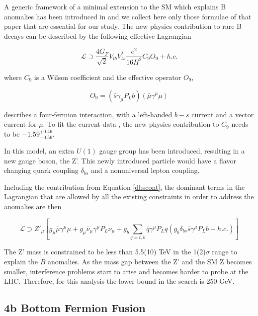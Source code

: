 A generic framework of a minimal extension to the SM which explains B anomalies has been introduced in \cite{Dalchenko:2017shg} and we collect here only those formulae of that paper that are essential for our study. The new physics contribution to rare B decays can be described by the following effective Lagrangian 

\begin{equation}
\label{dbscont}
\mathcal{L} \supset \frac{4G_{F}}{\sqrt{2}}V_{tb}V_{ts}^{*}\frac{e^{2}}{16\Pi^{2}}C_{9}O_{9} + h.c.
\end{equation}

where $C_{9}$ is a Wilson coefficient and the effective operator $O_{9}$,

\begin{equation}
O_{9} = (\bar{s}\gamma_{\mu}P_{L}b)(\bar{\mu}\gamma^{\mu}\mu)
\end{equation}

describes a four-fermion interaction, with a left-handed $b-s$ current and a vector current for $\mu$. To fit the current data \cite{PhysRevD.96.055008}, the new physics contribution to $C_{9}$ needs to be $-1.59_{-0.56}^{+0.46}$.

In this model, an extra $U(1)$ gauge group has been introduced, resulting in a new gauge boson, the Z'. This newly introduced particle would have a flavor changing quark coupling $\delta_{bs}$ and a nonuniversal lepton coupling.

Including the contribution from Equation \ref{dbscont}, the dominant terms in the Lagrangian that are allowed by all the existing constraints in order to address the anomalies are then

\begin{equation}
\label{Zlag}
\mathcal{L} \supset Z'_{\mu}[g_{\mu}\bar{\mu}\gamma^{\mu}\mu + g_{\mu}\bar{\nu}_{\mu}\gamma^{\mu}P_{L}\nu_{\mu} + g_{b}\sum_{q=t,b}\bar{q}\gamma^{\mu}P_{L}q (g_{b}\delta_{bs}\bar{s}\gamma^{\mu}P_{L}b +h.c.)]
\end{equation}

The Z' mass is constrained to be less than 5.5(10) TeV in the 1(2)$\sigma$ range to explain the $B$ anomalies\cite{PhysRevD.89.095033}. As the mass gap between the Z' and the SM Z becomes smaller, interference problems start to arise and becomes harder to probe at the LHC. Therefore, for this analysis the lower bound in the search is 250 GeV.

\subsection{4b Bottom Fermion Fusion}

